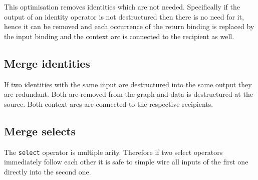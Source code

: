 This optimisation removes identities which are not needed.
Specifically if the output of an identity operator is not destructured then there is no need for it, hence it can be removed and each occurrence of the return binding is replaced by the input binding and the context arc is connected to the recipient as well.

\subsection{Merge identities}

If two identities with the same input are destructured into the same output they are redundant.
Both are removed from the graph and data is destructured at the source.
Both context arcs are connected to the respective recipients.

\subsection{Merge selects}

The \texttt{select} operator is multiple arity.
Therefore if two select operators immediately follow each other it is safe to simple wire all inputs of the first one directly into the second one.
